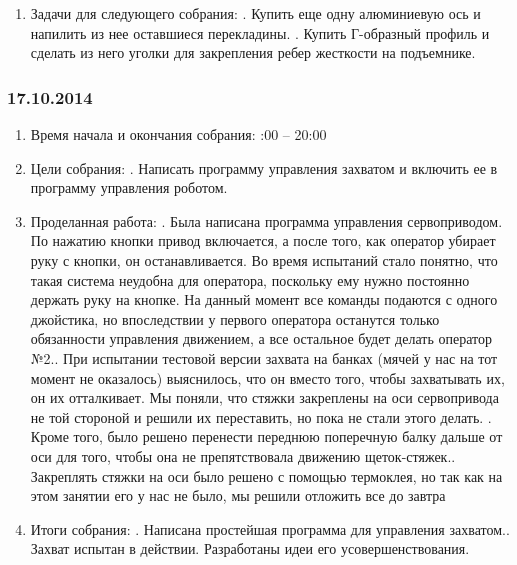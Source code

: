 \documentclass[11pt]{article}
\begin{document}
\begin{enumerate}
            \item Задачи для следующего собрания:
            .   Купить еще одну алюминиевую ось и напилить из нее оставшиеся перекладины.
            .   Купить Г-образный профиль и сделать из него уголки для закрепления ребер жесткости на подъемнике.
         \end{enumerate}
         \newpage
         \subsubsection{17.10.2014}
         \begin{enumerate}
            \item Время начала и окончания собрания:
            :00 – 20:00
            \item Цели собрания:
            .   Написать программу управления захватом и включить ее в программу управления роботом.
            \item Проделанная работа:
            .   Была написана программа управления сервоприводом. По нажатию кнопки привод включается, а после того, как оператор убирает руку с кнопки, он останавливается. Во время испытаний стало понятно, что такая система неудобна для оператора, поскольку ему нужно постоянно держать руку на кнопке. На данный момент все команды подаются с одного джойстика, но впоследствии у первого оператора останутся только обязанности управления движением, а все остальное будет делать оператор №2..   При испытании тестовой версии захвата на банках (мячей у нас на тот момент не оказалось) выяснилось, что он вместо того, чтобы захватывать их, он их отталкивает. Мы поняли, что стяжки закреплены на оси сервопривода не той стороной и решили их переставить, но пока не стали этого делать.  .   Кроме того, было решено перенести переднюю поперечную балку дальше от оси для того, чтобы она не препятствовала движению щеток-стяжек..   Закреплять стяжки на оси было решено с помощью термоклея, но так как на этом занятии его у нас не было, мы решили отложить все до завтра
            \newline
            \item Итоги собрания:
            .   Написана простейшая программа для управления захватом..   Захват испытан в действии. Разработаны идеи его усовершенствования.
            

\end{enumerate}
\end{document}
